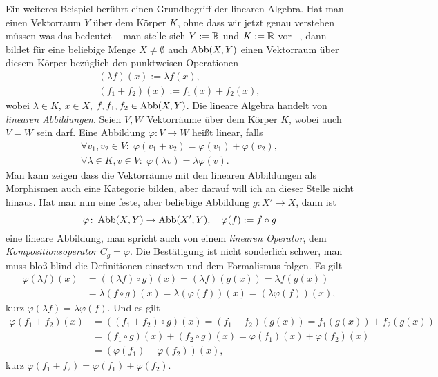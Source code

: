 Ein weiteres Beispiel berührt einen Grundbegriff der linearen Algebra.
Hat man einen Vektorraum $Y$ über dem Körper $K$, ohne dass wir jetzt
genau verstehen müssen was das bedeutet -- man stelle sich $Y:=\mathbb R$
und $K:=\mathbb R$ vor --, dann bildet für eine beliebige Menge $X\ne\emptyset$
auch $\operatorname{Abb}(X,Y)$ einen Vektorraum über diesem Körper bezüglich den
punktweisen Operationen%
\begin{gather*}
(\lambda f)(x) := \lambda f(x),\\
(f_1+f_2)(x) := f_1(x)+f_2(x),
\end{gather*} 
wobei $\lambda\in K$, $x\in X$, $f,f_1,f_2\in\operatorname{Abb}(X,Y)$. Die lineare
Algebra handelt von \emph{linearen Abbildungen}. Seien $V,W$
Vektorräume über dem Körper $K$, wobei auch $V=W$ sein darf. Eine
Abbildung $\varphi\colon V\to W$ heißt linear, falls%
\begin{gather*}
\forall v_1,v_2\in V\colon\;\varphi(v_1+v_2) = \varphi(v_1)+\varphi(v_2),\\
\forall \lambda\in K,v\in V\colon\;\varphi(\lambda v) = \lambda\varphi(v).
\end{gather*}
Man kann zeigen dass die Vektorräume mit den linearen Abbildungen
als Morphismen auch eine Kategorie bilden, aber darauf will ich an
dieser Stelle nicht hinaus. Hat man nun eine feste, aber beliebige
Abbildung $g\colon X'\to X$, dann ist%
\[\varphi\colon\operatorname{Abb}(X,Y)\to\operatorname{Abb}(X',Y),\quad \varphi(f):=f\circ g\]
eine lineare Abbildung, man spricht auch von einem
\emph{linearen Operator}, dem \emph{Kompositionsoperator}
$C_g=\varphi$. Die Bestätigung ist nicht sonderlich schwer, man
muss bloß blind die Definitionen einsetzen und dem Formalismus
folgen. Es gilt%
\begin{align*}
\varphi(\lambda f)(x) &= ((\lambda f)\circ g)(x)
= (\lambda f)(g(x)) = \lambda f(g(x))\\
&= \lambda (f\circ g)(x) = \lambda (\varphi(f))(x)
= (\lambda\varphi(f))(x),
\end{align*}
kurz $\varphi(\lambda f)=\lambda\varphi(f)$. Und es gilt
\begin{align*}
\varphi(f_1+f_2)(x) &= ((f_1+f_2)\circ g)(x)
= (f_1+f_2)(g(x)) = f_1(g(x)) + f_2(g(x))\\
&= (f_1\circ g)(x) + (f_2\circ g)(x)
= \varphi(f_1)(x)+\varphi(f_2)(x)\\
&= (\varphi(f_1)+\varphi(f_2))(x),
\end{align*}
kurz $\varphi(f_1+f_2)=\varphi(f_1)+\varphi(f_2)$.


